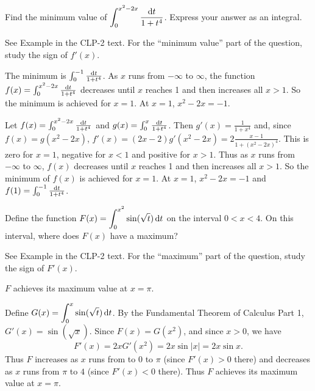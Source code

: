 \begin{question}[2001A]
Find the minimum value of $\displaystyle\int_0^{x^2-2x}\frac{\mathrm{d}t}{1+t^4}$.
Express your answer as an integral.
\end{question}

\begin{hint}
See Example  in the
CLP-2 text. For the ``minimum value''  part of the question, study the sign
of $f'(x)$.
\end{hint}

\begin{answer}
The minimum is $\int_0^{-1} \frac{\mathrm{d}t}{1+t^4}$.
As $x$ runs from $-\infty$ to $\infty$, the function $f(x)= \int_0^{x^2-2x}\frac{\mathrm{d}t}{1+t^4}$
decreases until $x$ reaches 1 and then increases all $x>1$. So the minimum is achieved
for $x=1$.   At $x=1$, $x^2-2x=-1$.
\end{answer}

\begin{solution}
Let $f(x)=\int_0^{x^2-2x}\frac{\mathrm{d}t}{1+t^4}$ and
$g(x)= \int_0^{x}\frac{\mathrm{d}t}{1+t^4}$. Then $g'(x)=\frac{1}{1+x^4}$ and,
since $f(x)=g(x^2-2x)$, $f'(x)=(2x-2)g'(x^2-2x)=2\frac{x-1}{1+(x^2-2x)^4}$.
This is zero for $x=1$, negative for $x<1$ and positive for $x>1$.
Thus as $x$ runs from $-\infty$ to $\infty$, $f(x)$ decreases until $x$
reaches 1 and then increases all $x>1$. So the minimum of $f(x)$ is achieved
for $x=1$. At $x=1$, $x^2-2x=-1$ and
$f(1)=\int_0^{-1}\frac{\mathrm{d}t}{1+t^4}$.
\end{solution}

\begin{question}[2001D]
 Define the function $F(x)=\displaystyle\int_0^{x^2}\sin(\sqrt{t})\,\mathrm{d}t$
  on the interval $0<x<4$. On this interval, where does $F(x)$ have a maximum?
\end{question}

\begin{hint}
See Example  in the
CLP-2 text. For the ``maximum''  part of the question, study the sign
of $F'(x)$.
\end{hint}

\begin{answer}
 $F$ achieves its maximum value at $x=\pi$.
\end{answer}

\begin{solution}
Define $G(x)=\displaystyle\int_0^x\sin(\sqrt{t})\,\mathrm{d}t$. By the Fundamental Theorem of Calculus Part 1, $G'(x)=\sin(\sqrt{x})$.
Since $F(x)=G(x^2)$, and since $x>0$, we have \[F'(x)=2xG'(x^2)=2x\sin |x|=2x\sin x.\] Thus $F$ increases
as $x$ runs from to $0$ to $\pi$ (since $F'(x)>0$ there) and decreases
as $x$ runs from $\pi$ to $4$ (since $F'(x)<0$ there). Thus $F$ achieves its
maximum value at $x=\pi$.
\end{solution}


